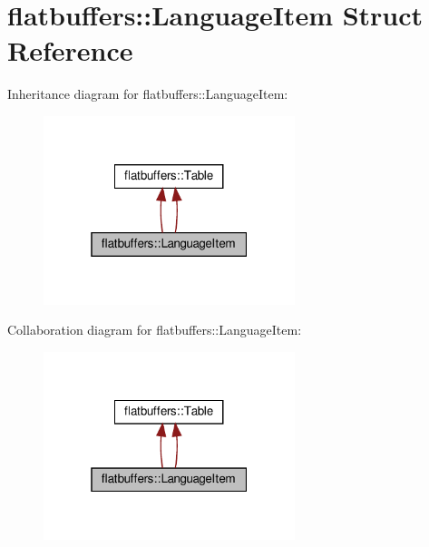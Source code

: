 \hypertarget{structflatbuffers_1_1LanguageItem}{}\section{flatbuffers\+:\+:Language\+Item Struct Reference}
\label{structflatbuffers_1_1LanguageItem}


Inheritance diagram for flatbuffers\+:\+:Language\+Item\+:
\nopagebreak
\begin{figure}[H]
\begin{center}
\leavevmode
\includegraphics[width=208pt]{structflatbuffers_1_1LanguageItem__inherit__graph}
\end{center}
\end{figure}


Collaboration diagram for flatbuffers\+:\+:Language\+Item\+:
\nopagebreak
\begin{figure}[H]
\begin{center}
\leavevmode
\includegraphics[width=208pt]{structflatbuffers_1_1LanguageItem__coll__graph}
\end{center}
\end{figure}
